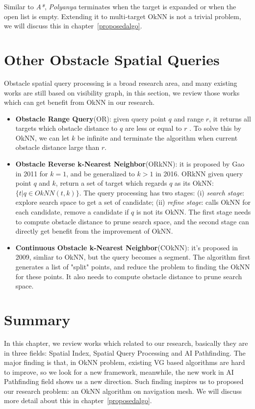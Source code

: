 Similar to \textit{A*}, \textit{Polyanya} terminates when the target is expanded or when the
open list is empty. Extending it to multi-target OkNN is not a trivial problem, we will discuss
this in chapter~\ref{proposedalgo}.

\section{Other Obstacle Spatial Queries}\label{lrquery}
Obstacle spatial query processing is a broad research area, and many existing works are still
based on visibility graph, in this section, we review those works which can get benefit from
OkNN in our research. 

\begin{itemize}

\item \textbf{Obstacle Range Query}(OR): given query point $q$ and range $r$,
  it returns all targets which obstacle distance to $q$ are less or equal to $r$ \cite{zhang2004spatial}. 
To solve this by OkNN, we can let $k$ be infinite and terminate the algorithm when current
obstacle distance large than $r$.

\item \textbf{Obstacle Reverse k-Nearest Neighbor}(ORkNN): it is proposed by Gao in
2011\cite{gao2011efficient} for $k=1$, and be generalized to $k>1$ in
2016\cite{gao2016reverse}. ORkNN given query point $q$ and $k$, return a set of target which
regards $q$ as its OkNN: $\{t | q \in OkNN(t, k)\}$. The query processing has two stages:
(i) \textit{search stage}: explore search space to get a set of candidate; (ii) \textit{refine
stage}: calls OkNN for each candidate, remove a candidate if $q$ is not its OkNN.
The first stage needs to compute obstacle distance to prune search space, and the second stage 
can directly get benefit from the improvement of OkNN.

\item \textbf{Continuous Obstacle k-Nearest Neighbor}(COkNN): it's proposed in
  2009\cite{gao2009continuous}, simliar to OkNN, but the query becomes a segment.
  The algorithm first generates a list of "split" points, and reduce the problem to finding the
    OkNN for these points. It also needs to compute obstacle distance to prune search space.

\end{itemize}

\section{Summary}
In this chapter, we review works which related to our research, basically they are in three
fields: Spatial Index, Spatial Query Processing and AI Pathfinding. The major finding is that,
in OkNN problem, existing VG based algorithms are hard to improve, so we look for a new
framework, meanwhile, the new work in AI Pathfinding field shows us a new direction.
Such finding inspires us to proposed our research problem: an OkNN algorithm on navigation mesh.
We will discuss more detail about this in chapter~\ref{proposedalgo}.
